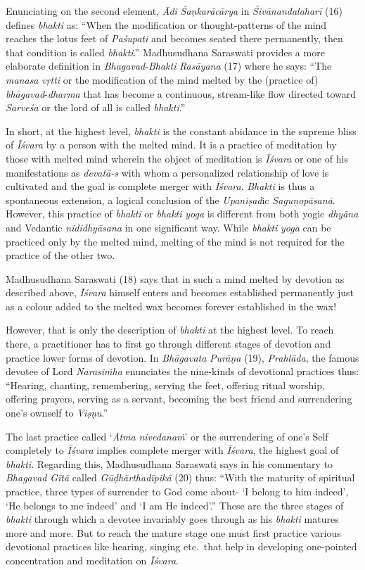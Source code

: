 Enunciating on the second element, \emph{Ādi} \emph{Śaṇkarācārya} in \emph{Śivānandalaharī} (16) defines \emph{bhakti} as: ``When the modification or thought-patterns of the mind reaches the lotus feet of \emph{Paśupati} and becomes seated there permanently, then that condition is called \emph{bhakti}.'' Madhusudhana Saraswati provides a more elaborate definition in \emph{Bhagavad}-\emph{Bhakti} \emph{Rasāyana} (17) where he says: ``The \emph{manasa} \emph{vṛtti} or the modification of the mind melted by the (practice of) \emph{bhāgavad}-\emph{dharma} that has become a continuous, stream-like flow directed toward \emph{Sarveśa} or the lord of all is called \emph{bhakti}.''

In short, at the highest level, \emph{bhakti} is the constant abidance in the supreme bliss of \emph{Īśvara} by a person with the melted mind. It is a practice of meditation by those with melted mind wherein the object of meditation is \emph{Īśvara} or one of his manifestations as \emph{devatā-s} with whom a personalized relationship of love is cultivated and the goal is complete merger with \emph{Īśvara}. \emph{Bhakti} is thus a spontaneous extension, a logical conclusion of the \emph{Upaniṣad}ic \emph{Saguṇopāsanā}. However, this practice of \emph{bhakti} or \emph{bhakti} \emph{yoga} is different from both yogic \emph{dhyāna} and Vedantic \emph{nididhyāsana} in one significant way. While \emph{bhakti} \emph{yoga} can be practiced only by the melted mind, melting of the mind is not required for the practice of the other two.

Madhusudhana Saraswati (18) says that in such a mind melted by devotion as described above, \emph{Īśvara} himself enters and becomes established permanently just as a colour added to the melted wax becomes forever established in the wax!

However, that is only the description of \emph{bhakti} at the highest level. To reach there, a practitioner has to first go through different stages of devotion and practice lower forms of devotion. In \emph{Bhāgavata} \emph{Purāṇa} (19), \emph{Prahlāda}, the famous devotee of Lord \emph{Narasiṁha} enunciates the nine-kinds of devotional practices thus: ``Hearing, chanting, remembering, serving the feet, offering ritual worship, offering prayers, serving as a servant, becoming the best friend and surrendering one's ownself to \emph{Viṣṇu}.''

The last practice called `\emph{Ātma} \emph{nivedanaṁ}' or the surrendering of one's Self completely to \emph{Īśvara} implies complete merger with \emph{Īśvara}, the highest goal of \emph{bhakti}. Regarding this, Madhusudhana Saraswati says in his commentary to \emph{Bhagavad} \emph{Gītā} called \emph{Gūḍhārthadīpikā} (20) thus: ``With the maturity of spiritual practice, three types of surrender to God come about- `I belong to him indeed', `He belongs to me indeed' and `I am He indeed'.'' These are the three stages of \emph{bhakti} through which a devotee invariably goes through as his \emph{bhakti} matures more and more. But to reach the mature stage one must first practice various devotional practices like hearing, singing etc.\ that help in developing one-pointed concentration and meditation on \emph{Īśvara}.

